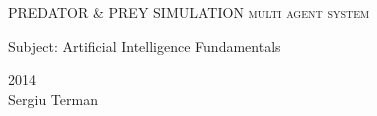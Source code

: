 \begin{titlepage}
    \centering
    \vspace*{30 mm}
    {\huge
    	PREDATOR \& PREY SIMULATION
    	{\scshape multi agent system}
    }
    
    \vspace{30 mm}
    {\Large Subject: Artificial Intelligence Fundamentals}
    
    \vfill
    {\scshape 2014} \\
    {\large Sergiu Terman}
\end{titlepage}
